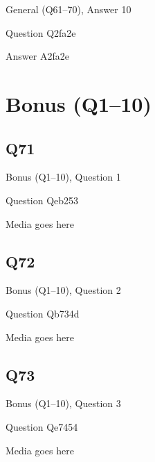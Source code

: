 \documentclass[11pt]{beamer}
\begin{document}
\begin{frame}[t]{General (Q61--70), Answer 10}
\vspace{2em}
\begin{block}{Question}
Q2fa2e
\end{block}
\pause{}
\begin{block}{Answer}
A2fa2e
\end{block}
\end{frame}
    

\section{Bonus (Q1--10)}
    

\subsection*{Q71}
\begin{frame}[t]{Bonus (Q1--10), Question 1}
\vspace{2em}
\begin{block}{Question}
Qeb253
\end{block}
\begin{center}
Media goes here
\end{center}
\end{frame}
    

\subsection*{Q72}
\begin{frame}[t]{Bonus (Q1--10), Question 2}
\vspace{2em}
\begin{block}{Question}
Qb734d
\end{block}
\begin{center}
Media goes here
\end{center}
\end{frame}
    

\subsection*{Q73}
\begin{frame}[t]{Bonus (Q1--10), Question 3}
\vspace{2em}
\begin{block}{Question}
Qe7454
\end{block}
\begin{center}
Media goes here
\end{center}
\end{frame}
    
\end{document}
